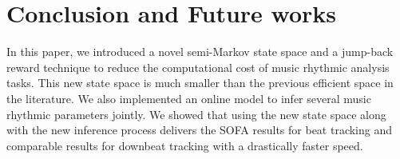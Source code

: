 \documentclass{article}
\begin{document}
\section{Conclusion and Future works}
\label{sec:conclusion}
In this paper, we introduced a novel 
semi-Markov
state space and a jump-back reward technique to reduce the computational cost of music rhythmic analysis tasks. This new state space is much smaller than the previous efficient space in the literature. We also implemented an online model to infer several music rhythmic parameters jointly. We showed that using the new state space along with the new inference process delivers the SOFA results for beat tracking and comparable results for downbeat tracking with a drastically faster speed.  

















\end{document}
